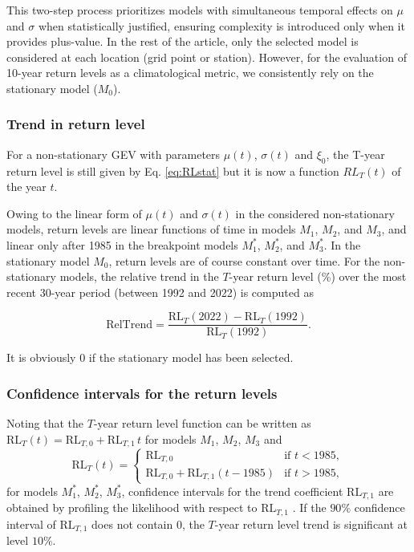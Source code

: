 \documentclass[french,a4paper,DIV=11,numbers=noendperiod]{scrartcl}
\begin{document}
This two-step process prioritizes models with simultaneous temporal
effects on \(\mu\) and \(\sigma\) when statistically justified, ensuring
complexity is introduced only when it provides plus-value. In the rest of the article, only the selected model is considered at each location (grid point or station). However, for the evaluation of 10-year return levels as a climatological metric, we consistently rely on the stationary model ($M_0$). 

\subsubsection{Trend in return level}\label{return-level}

For a non-stationary GEV with parameters $\mu(t)$, $\sigma(t)$ and $\xi_{0}$, the T-year return level is still given by Eq. \ref{eq:RLstat} but it is now a function $RL_T(t)$ of the year $t$.

Owing to the linear form of $\mu(t)$ and $\sigma(t)$ in the considered
non-stationary models, return levels are linear functions of time in
models $M_{1}$, $M_{2}$, and $M_{3}$, and linear only after 1985 in the
breakpoint models $M_{1}^{*}$, $M_{2}^{*}$, and $M_{3}^{*}$. In the
stationary model $M_{0}$, return levels are of course constant over time.
For the non-stationary models, the relative trend in the $T$-year return
level (\%) over the most recent 30-year period (between 1992 and 2022) is computed as

\[
\mathrm{RelTrend} =
\frac{\mathrm{RL}_{T}(2022)-\mathrm{RL}_{T}(1992)}
{\mathrm{RL}_{T}(1992)}.
\]

It is obviously $0$ if the stationary model has been selected.

\subsubsection{Confidence intervals for the return levels}\label{maximu-likelihood-estimation-and-confidence-intervales}

Noting that the
$T$-year return level function can be written as
$\mathrm{RL}_{T}(t)=\mathrm{RL}_{T,0}+\mathrm{RL}_{T,1}\, t$
for models $M_{1}$, $M_{2}$, $M_{3}$ and
\[
\mathrm{RL}_{T}(t)=
\begin{cases}
\mathrm{RL}_{T,0} & \text{if } t<1985,\\[4pt]
\mathrm{RL}_{T,0}+\mathrm{RL}_{T,1}(t-1985) & \text{if } t>1985,
\end{cases}
\]
for models $M_{1}^{*}$, $M_{2}^{*}$, $M_{3}^{*}$,
confidence intervals for the trend coefficient $\mathrm{RL}_{T,1}$ are obtained
by profiling the likelihood with respect to $\mathrm{RL}_{T,1}$ \parencite{coles2001introduction}. If
the $90\%$ confidence interval of $\mathrm{RL}_{T,1}$ does not contain $0$, the
$T$-year return level trend is significant at level $10\%$.
\end{document}
